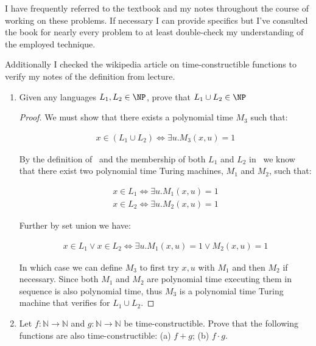 \documentclass[usletter]{article}
\begin{document}

I have frequently referred to the textbook \cite{textbook} and my notes throughout the course of working on these problems. If necessary I can provide specifics but I've consulted the book for nearly every problem to at least double-check my understanding of the employed technique.

Additionally I checked the wikipedia article on time-constructible functions \cite{wikipedia} to verify my notes of the definition from lecture.

\begin{enumerate}
  \item Given any languages $L_1, L_2 \in \NP$, prove that $L_1 \cup L_2 \in \NP$
    \begin{proof}
      We must show that there exists a polynomial time $M_3$ such that:

      \begin{align}
        x \in (L_1 \cup L_2) \iff \exists u.M_3(x,u) = 1
      \end{align}

      By the definition of \NP\ and the membership of both $L_1$ and $L_2$ in \NP\  we know that there exist two polynomial time Turing machines, $M_1$ and $M_2$, such that:

      \begin{align}
        x \in L_1 \iff \exists u.M_1(x,u) = 1 \\
        x \in L_2 \iff \exists u.M_2(x,u) = 1
      \end{align}

      Further by set union we have:

      \begin{align}
        x \in L_1 \lor x \in L_2 \iff \exists u.M_1(x,u) = 1 \lor  M_2(x,u) = 1
      \end{align}

      In which case we can define $M_3$ to first try $x,u$ with $M_1$ and then $M_2$ if necessary. Since both $M_1$ and $M_2$ are polynomial time executing them in sequence is also polynomial time, thus $M_3$ is a polynomial time Turing machine that verifies for $L_1 \cup L_2$.
    \end{proof}

  \item Let $f : \mathbb{N} \rightarrow \mathbb{N}$ and $g : \mathbb{N} \rightarrow \mathbb{N}$ be time-constructible. Prove that the following functions are also time-constructible: (a) $f + g$; (b) $f \cdot g$.



\end{enumerate}
\end{document}
